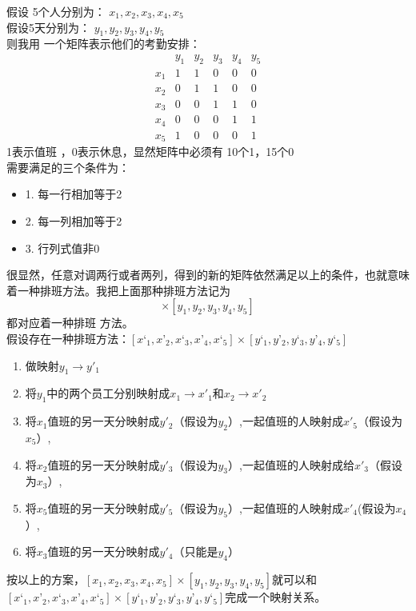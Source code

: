 \documentclass{ctexart} %
\begin{document}
 假设 5个人分别为： $x_1,x_2,x_3,x_4,x_5$\\
 假设5天分别为：  $y_1,y_2,y_3,y_4,y_5$\\
则我用 一个矩阵表示他们的考勤安排：
\begin{equation}
\begin{array}{cccccc}
 &y_1&y_2&y_3&y_4&y_5\\
x_1&1&1&0&0&0\\
x_2&0&1&1&0&0\\
x_3&0&0&1&1&0\\
x_4&0&0&0&1&1\\
x_5&1&0&0&0&1
\end{array}
\end{equation}
1表示值班 ，0表示休息，显然矩阵中必须有 10个1，15个0\\
需要满足的三个条件为： 
\begin{itemize}
\item  1. 每一行相加等于2 
\item  2. 每一列相加等于2
\item  3. 行列式值非0
\end{itemize}


很显然，任意对调两行或者两列，得到的新的矩阵依然满足以上的条件，也就意味着一种排班方法。我把上面那种排班方法记为
\begin{equation}
[x_1,x_2,x_3,x_4,x_5]\times[y_1,y_2,y_3,y_4,y_5]
\end{equation}
都对应着一种排班 方法。\\

假设存在一种排班方法：$[x‘_1,x’_2,x‘_3,x’_4,x‘_5]\times[y‘_1,y’_2,y‘_3,y’_4,y‘_5]$
\begin{enumerate}[(1)]
\item 做映射$y_1\rightarrow y'_1$
\item 将$y_1$中的两个员工分别映射成$x_1\rightarrow x'_1$和$x_2\rightarrow x'_2$
\item 将$x_1$值班的另一天分映射成$y'_2$（假设为$y_2$）,一起值班的人映射成$x'_5$（假设为$x_5$）,
\item 将$x_2$值班的另一天分映射成$y'_3$（假设为$y_3$）,一起值班的人映射成给$x'_3$（假设为$x_3$）,
\item 将$x_5$值班的另一天分映射成$y'_5$（假设为$y_5$）,一起值班的人映射成$x'_4$(假设为$x_4$）,
\item 将$x_3$值班的另一天分映射成$y'_4$（只能是$y_4$）
\end{enumerate}
按以上的方案，$[x_1,x_2,x_3,x_4,x_5]\times[y_1,y_2,y_3,y_4,y_5]$就可以和$[x‘_1,x’_2,x‘_3,x’_4,x‘_5]\times[y‘_1,y’_2,y‘_3,y’_4,y‘_5]$完成一个映射关系。
\end{document}
